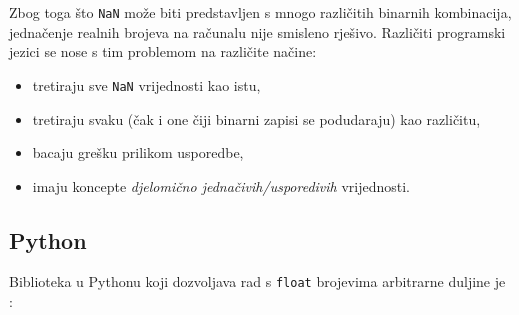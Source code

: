 Zbog toga što \verb|NaN| može biti predstavljen s mnogo različitih binarnih kombinacija, jednačenje realnih brojeva na računalu nije smisleno rješivo. Različiti programski jezici se nose s tim problemom na različite načine:

\begin{itemize}
    \item tretiraju sve \verb|NaN| vrijednosti kao istu,
    \item tretiraju svaku (čak i one čiji binarni zapisi se podudaraju) kao različitu,
    \item bacaju grešku prilikom usporedbe,
    \item imaju koncepte \textit{djelomično jednačivih/usporedivih} vrijednosti.
\end{itemize}

\subsection{Python}

Biblioteka u Pythonu koji dozvoljava rad s \verb|float| brojevima arbitrarne duljine je :


